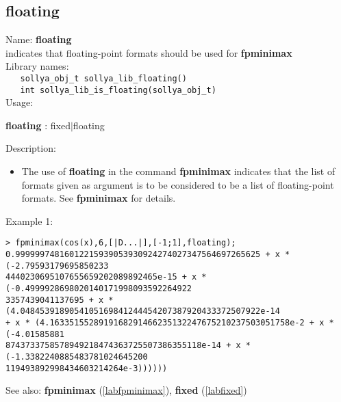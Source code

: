 \subsection{floating}
\label{labfloating}
\noindent Name: \textbf{floating}\\
\phantom{aaa}indicates that floating-point formats should be used for \textbf{fpminimax}\\[0.2cm]
\noindent Library names:\\
\verb|   sollya_obj_t sollya_lib_floating()|\\
\verb|   int sollya_lib_is_floating(sollya_obj_t)|\\[0.2cm]
\noindent Usage: 
\begin{center}
\textbf{floating} : \textsf{fixed$|$floating}\\
\end{center}
\noindent Description: \begin{itemize}

\item The use of \textbf{floating} in the command \textbf{fpminimax} indicates that the list of
   formats given as argument is to be considered to be a list of floating-point
   formats.
   See \textbf{fpminimax} for details.
\end{itemize}
\noindent Example 1: 
\begin{center}\begin{minipage}{15cm}\begin{Verbatim}[frame=single,commandchars=\\\|\~]
> fpminimax(cos(x),6,[|D...|],[-1;1],floating);
0.99999974816012215939053930924274027347564697265625 + x * (-2.79593179695850233
4440230695107655659202089892465e-15 + x * (-0.4999928698020140171998093592264922
3357439041137695 + x * (4.0484539189054105169841244454207387920433372507922e-14 
+ x * (4.1633515528919168291466235132247675210237503051758e-2 + x * (-4.01585881
8743733758578949218474363725507386355118e-14 + x * (-1.3382240885483781024645200
119493892998434603214264e-3))))))
\end{Verbatim}
\end{minipage}\end{center}
See also: \textbf{fpminimax} (\ref{labfpminimax}), \textbf{fixed} (\ref{labfixed})
